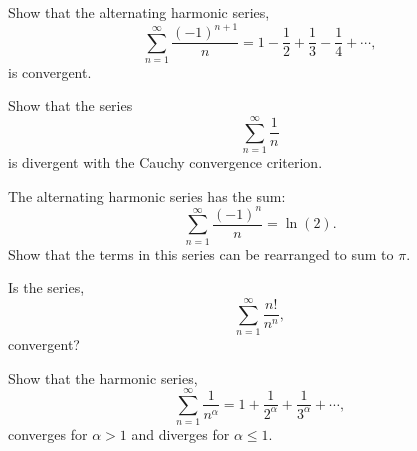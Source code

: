 {\begin{Exercise}
\end{Exercise}


\begin{Exercise}
  \label{exercise alternating harmonic series}
  Show that the alternating harmonic series,
  \[
  \sum_{n = 1}^\infty \frac{(-1)^{n+1}}{n} = 1 - \frac{1}{2} + \frac{1}{3} - \frac{1}{4}
  + \cdots,
  \]
  is convergent.

\end{Exercise}



\begin{Exercise}
  \label{exercise divergent harmonic series}
  Show that the series
  \[
  \sum_{n = 1}^\infty \frac{1}{n}
  \]
  is divergent with the Cauchy convergence criterion.

\end{Exercise}



\begin{Exercise}
  \label{exercise rearrange alternating harmonic series}
  The alternating harmonic series has the sum:
  \[
  \sum_{n = 1}^\infty \frac{(-1)^n}{n} = \ln(2).
  \]
  Show that the terms in this series can be rearranged to sum to $\pi$.

\end{Exercise}




\begin{Exercise}
  \label{exercise sum n!/n^n}
  Is the series,
  \[
  \sum_{n = 1}^\infty \frac{n!}{n^n},
  \]
  convergent?

\end{Exercise}



\begin{Exercise}
  \label{exercise harmonic series}
  Show that the harmonic series,
  \[ 
  \sum_{n=1}^\infty \frac{1}{n^\alpha} = 1 + \frac{1}{2^\alpha} + \frac{1}{3^\alpha} + \cdots,
  \]
  converges for $\alpha > 1$ and diverges for $\alpha \leq 1$.


\end{Exercise}}
